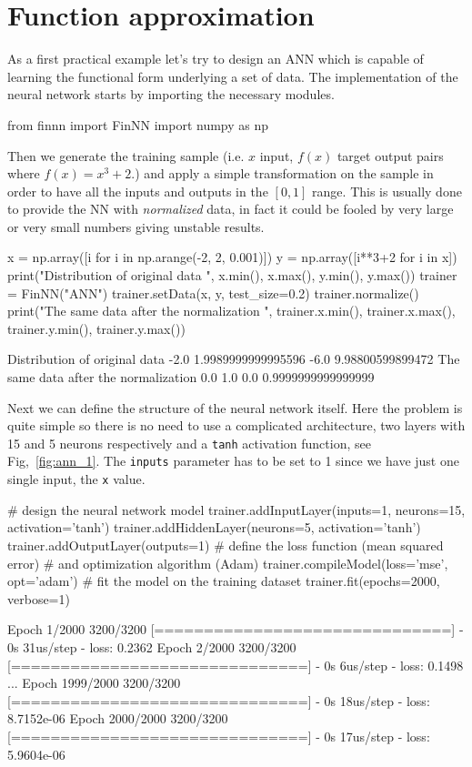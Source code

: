 \section{Function approximation}\label{function-approximation}

As a first practical example let's try to design an ANN which is capable
of learning the functional form underlying a set of data.
The implementation of the neural network starts by importing the necessary modules.

\begin{ipython}
from finnn import FinNN
import numpy as np
\end{ipython}

Then we generate the training sample (i.e. \(x\) input, \(f(x)\) target output
pairs where \(f(x) = x^3 +2\).)
and apply a simple transformation on the sample in order to have all the
inputs and outputs in the \([0, 1]\) range. This is usually done to
provide the NN with \emph{normalized} data, in fact it could be fooled
by very large or very small numbers giving unstable results.

\begin{ipython}
x = np.array([i for i in np.arange(-2, 2, 0.001)])
y = np.array([i**3+2 for i in x])
print("Distribution of original data ", x.min(), x.max(), y.min(), y.max())
trainer = FinNN("ANN")
trainer.setData(x, y, test_size=0.2)
trainer.normalize()
print("The same data after the normalization ", trainer.x.min(),
       trainer.x.max(), trainer.y.min(), trainer.y.max())
\end{ipython}
\begin{ioutput}
Distribution of original data  -2.0 1.9989999999995596 -6.0 9.98800599899472
The same data after the normalization  0.0 1.0 0.0 0.9999999999999999
\end{ioutput}

Next we can define the structure of the neural network itself. 
Here the problem is quite simple so there is no need to use a complicated architecture,
two layers with 15 and 5 neurons respectively and a \texttt{tanh} activation function, 
see Fig,~\ref{fig:ann_1}. The \texttt{inputs} parameter has to be
set to 1 since we have just one single input, the \texttt{x} value.

\begin{ipython}
# design the neural network model
trainer.addInputLayer(inputs=1, neurons=15, activation='tanh')
trainer.addHiddenLayer(neurons=5, activation='tanh')
trainer.addOutputLayer(outputs=1)
# define the loss function (mean squared error)
# and optimization algorithm (Adam)
trainer.compileModel(loss='mse', opt='adam')
# fit the model on the training dataset
trainer.fit(epochs=2000, verbose=1)
\end{ipython}
\begin{ioutput}
Epoch 1/2000
3200/3200 [==============================] - 0s 31us/step - loss: 0.2362
Epoch 2/2000
3200/3200 [==============================] - 0s 6us/step - loss: 0.1498
...
Epoch 1999/2000
3200/3200 [==============================] - 0s 18us/step - loss: 8.7152e-06
Epoch 2000/2000
3200/3200 [==============================] - 0s 17us/step - loss: 5.9604e-06
\end{ioutput}

